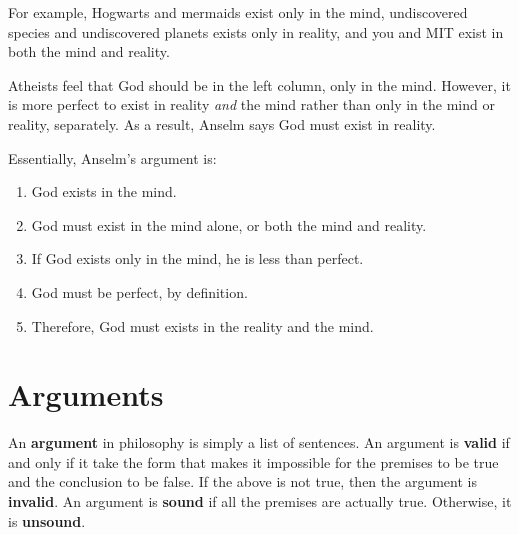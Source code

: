 \documentclass{article}
\begin{document}
For example, Hogwarts and mermaids exist only in the mind, undiscovered species
and undiscovered planets exists only in reality, and you and MIT exist in both
the mind and reality.

Atheists feel that God should be in the left column, only in the mind. However,
it is more perfect to exist in reality \textit{and} the mind rather than only in
the mind or reality, separately. As a result, Anselm says God must exist in
reality.

Essentially, Anselm's argument is:

\begin{enumerate}
  \item God exists in the mind.
  \item God must exist in the mind alone, or both the mind and reality.
  \item If God exists only in the mind, he is less than perfect.
  \item God must be perfect, by definition.
  \item Therefore, God must exists in the reality and the mind.
\end{enumerate}

\section{Arguments}

An \textbf{argument} in philosophy is simply a list of sentences. An argument is
\textbf{valid} if and only if it take the form that makes it impossible for the
premises to be true and the conclusion to be false. If the above is not true,
then the argument is \textbf{invalid}. An argument is \textbf{sound} if all the
premises are actually true. Otherwise, it is \textbf{unsound}.
\end{document}
